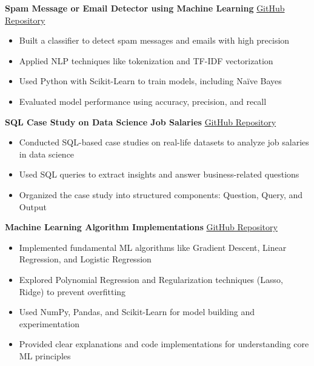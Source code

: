 \documentclass[11.5pt,a4paper]{article}
\newcommand{\projectitem}[2]{%
  \noindent\textbf{#1} \hfill \textcolor{subtext}{\href{#2}{GitHub Repository}}\par
}
\begin{document}
\vspace{10pt}
\projectitem{Spam Message or Email Detector using Machine Learning}{https://github.com/ShahidulHaqueShaheeen/Spam_MessageOrMail_Detector.git}
\begin{itemize}
    \item Built a classifier to detect spam messages and emails with high precision
    \item Applied NLP techniques like tokenization and TF-IDF vectorization
    \item Used Python with Scikit-Learn to train models, including Na\"ive Bayes
    \item Evaluated model performance using accuracy, precision, and recall
\end{itemize}

\vspace{10pt}
\projectitem{SQL Case Study on Data Science Job Salaries}{https://github.com/ShahidulHaqueShaheeen/SQL-Case-Studies.git}
\begin{itemize}
    \item Conducted SQL-based case studies on real-life datasets to analyze job salaries in data science
    \item Used SQL queries to extract insights and answer business-related questions
    \item Organized the case study into structured components: Question, Query, and Output
\end{itemize}

\vspace{10pt}
\projectitem{Machine Learning Algorithm Implementations}{https://github.com/ShahidulHaqueShaheeen/ML_Algorithms.git}
\begin{itemize}
    \item Implemented fundamental ML algorithms like Gradient Descent, Linear Regression, and Logistic Regression
    \item Explored Polynomial Regression and Regularization techniques (Lasso, Ridge) to prevent overfitting
    \item Used NumPy, Pandas, and Scikit-Learn for model building and experimentation
    \item Provided clear explanations and code implementations for understanding core ML principles
\end{itemize}
\end{document}
